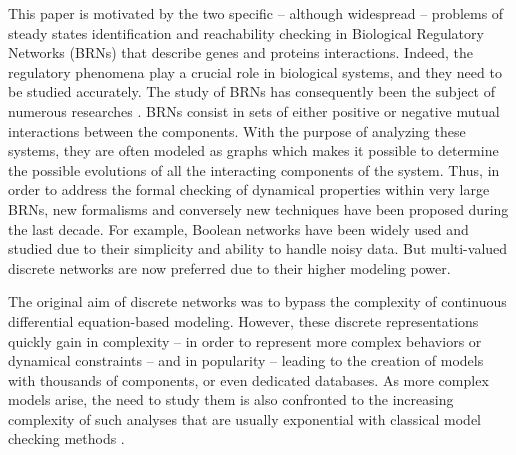 This paper is motivated by the two specific -- although widespread -- problems of steady states identification and reachability checking in Biological Regulatory Networks (BRNs) that describe genes and proteins interactions. Indeed, the regulatory phenomena play a crucial role in biological systems, and they need to be studied accurately. The study of BRNs has consequently been the subject of numerous researches \cite{thieffry1999modularity, shermin20092}. BRNs consist in sets of either positive or negative mutual interactions between the components. With the purpose of analyzing these systems, they are often modeled as graphs which makes it possible to determine the possible evolutions of all the interacting components of the system. Thus, in order to address the formal checking of dynamical properties within very large BRNs, new formalisms and conversely new techniques have been proposed during the last decade. For example, Boolean networks \cite{stuart1993origins} have been widely used and studied due to their simplicity and ability to handle noisy data. But multi-valued discrete networks are now preferred due to their higher modeling power.

The original aim of discrete networks \cite{kauffman69,Thomas73} was to bypass the complexity of
continuous differential equation-based modeling.
However, these discrete representations quickly gain in complexity -- in order to represent more complex behaviors or dynamical constraints --
and in popularity -- leading to the creation of models with thousands of components, or even dedicated databases.
As more complex models arise, the need to study them is also confronted to the increasing complexity of such analyses
that are usually exponential with classical model checking methods \cite{Harel02}.

